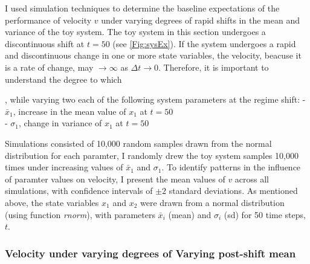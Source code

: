 \documentclass[12pt,twoside,openany]{reedthesis}
\begin{document}
I used simulation techniques to determine the baseline expectations of the performance of velocity \(v\) under varying degrees of rapid shifts in the mean and variance of the toy system. The toy system in this section undergoes a discontinuous shift at \(t = 50\) (see \ref{Fig:sysEx}). If the system undergoes a rapid and discontinuous change in one or more state variables, the velocity, beacuse it is a rate of change, may \(\rightarrow \infty\) as \(\Delta t \rightarrow 0\). Therefore, it is important to understand the degree to which

, while varying two each of the following system parameters at the regime shift:
- \(\bar{x}_1\), increase in the mean value of \(x_1\) at \(t=50\)\\
- \(\sigma_1\), change in variance of \(x_1\) at \(t=50\)

Simulations consisted of 10,000 random samples drawn from the normal distribution for each paramter, I randomly drew the toy system samples 10,000 times under increasing values of \(\bar{x}_1\) and \(\sigma_1\). To identify patterns in the influence of paramter values on velocity, I present the mean values of \(v\) across all simulations, with confidence intervals of \(\pm 2\) standard deviations. As mentioned above, the state variables \(x_1\) and \(x_2\) were drawn from a normal distribution (using function \emph{rnorm}), with parameters \(\bar{x}_i\) (mean) and \(\sigma_i\) (sd) for 50 time steps, \(t\).

\hypertarget{velocity-under-varying-degrees-of-varying-post-shift-mean}{%
\subsubsection{Velocity under varying degrees of Varying post-shift mean}\label{velocity-under-varying-degrees-of-varying-post-shift-mean}}
\end{document}
